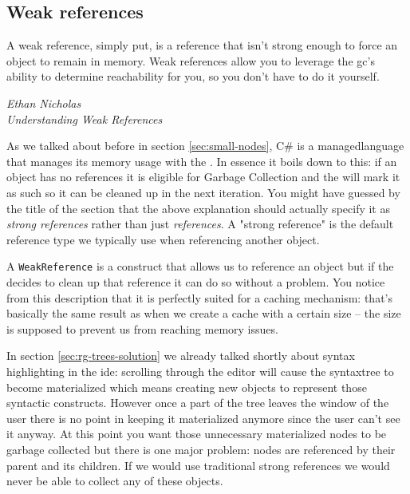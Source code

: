 \subsection{Weak references}
\label{sec:weak-references}

\epigraph{A weak reference, simply put, is a reference that isn't strong enough to force an object to remain in memory. Weak references allow you to leverage the \gls{gc}'s ability to determine reachability for you, so you don't have to do it yourself.}
{\textit{Ethan Nicholas \\ \footnotesize{Understanding Weak References\protect\footnotemark}}}


As we talked about before in section \ref{sec:small-nodes}, C\# is a \gls{managedlanguage} that manages its memory usage with the . In essence it boils down to this: if an object has no references it is eligible for Garbage Collection and the  will mark it as such so it can be cleaned up in the next iteration. You might have guessed by the title of the section that the above explanation should actually specify it as \textit{strong references} rather than just \textit{references}. A "strong reference" is the default reference type we typically use when referencing another object.

A \texttt{WeakReference} is a construct that allows us to reference an object but if the  decides to clean up that reference it can do so without a problem. You notice from this description that it is perfectly suited for a caching mechanism: that's basically the same result as when we create a cache with a certain size -- the size is supposed to prevent us from reaching memory issues.

In section \ref{sec:rg-trees-solution} we already talked shortly about \gls{syntax} highlighting in the \gls{ide}: scrolling through the editor will cause the \gls{syntaxtree} to become materialized which means creating new objects to represent those syntactic constructs. However once a part of the tree leaves the window of the user there is no point in keeping it materialized anymore since the user can't see it anyway. At this point you want those unnecessary materialized nodes to be garbage collected but there is one major problem: nodes are referenced by their parent and its children. If we would use traditional strong references we would never be able to collect any of these objects.

